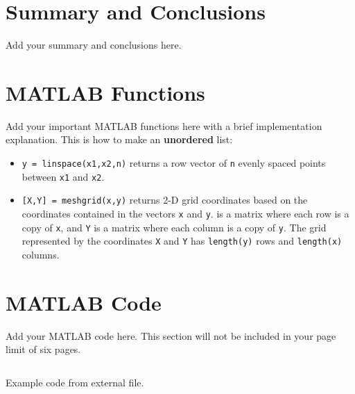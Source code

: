 \documentclass{article}
\begin{document}
\section{Summary and Conclusions}
Add your summary and conclusions here.

\printbibliography

\begin{appendices}

\section{MATLAB Functions}
Add your important MATLAB functions here with a brief implementation explanation. This is how to make an \textbf{unordered} list:
\begin{itemize}
    \item \texttt{y = linspace(x1,x2,n)} returns a row vector of \texttt{n} evenly spaced points between \texttt{x1} and \texttt{x2}. 
    \item \texttt{[X,Y] = meshgrid(x,y)} returns 2-D grid coordinates based on the coordinates contained in the vectors \texttt{x} and \texttt{y}.  is a matrix where each row is a copy of \texttt{x}, and \texttt{Y} is a matrix where each column is a copy of \texttt{y}. The grid represented by the coordinates \texttt{X} and \texttt{Y} has \texttt{length(y)} rows and \texttt{length(x)} columns.  
\end{itemize}

\section{MATLAB Code}
Add your MATLAB code here. This section will not be included in your page limit of six pages.

\begin{listing}[h]
\inputminted{matlab}{example.m}
\caption{Example code from external file.}
\label{listing:examplecode}
\end{listing}

\end{appendices}
\end{document}
